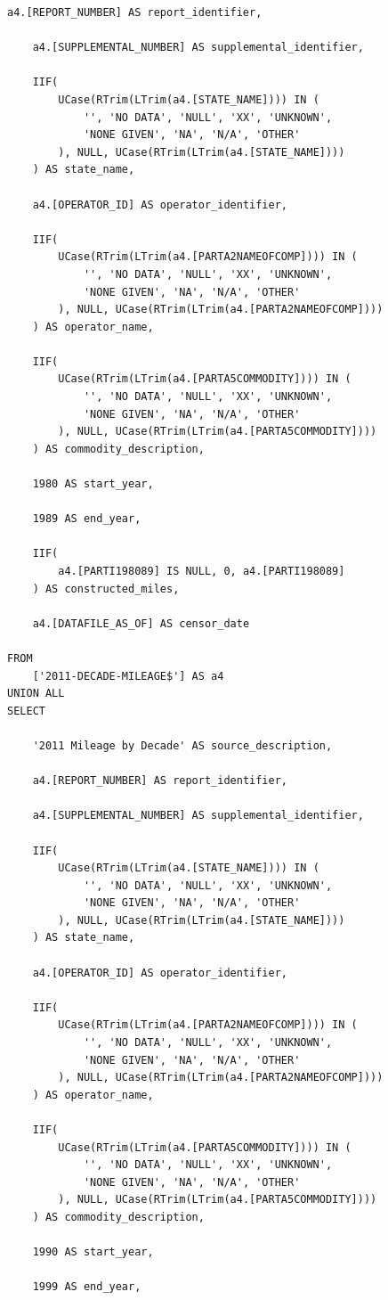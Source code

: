 \documentclass[letterpaper,10pt,oneside,final,onecolumn]{article}
\begin{document}
\begin{lstlisting}[label=mileage-query,caption={\textit{JetSQL} statement to pivot pipeline mileage}]
	a4.[REPORT_NUMBER] AS report_identifier,

	a4.[SUPPLEMENTAL_NUMBER] AS supplemental_identifier,

	IIF(
		UCase(RTrim(LTrim(a4.[STATE_NAME]))) IN (
			'', 'NO DATA', 'NULL', 'XX', 'UNKNOWN',
			'NONE GIVEN', 'NA', 'N/A', 'OTHER'
		), NULL, UCase(RTrim(LTrim(a4.[STATE_NAME])))
	) AS state_name,

	a4.[OPERATOR_ID] AS operator_identifier,

	IIF(
		UCase(RTrim(LTrim(a4.[PARTA2NAMEOFCOMP]))) IN (
			'', 'NO DATA', 'NULL', 'XX', 'UNKNOWN',
			'NONE GIVEN', 'NA', 'N/A', 'OTHER'
		), NULL, UCase(RTrim(LTrim(a4.[PARTA2NAMEOFCOMP])))
	) AS operator_name,

	IIF(
		UCase(RTrim(LTrim(a4.[PARTA5COMMODITY]))) IN (
			'', 'NO DATA', 'NULL', 'XX', 'UNKNOWN',
			'NONE GIVEN', 'NA', 'N/A', 'OTHER'
		), NULL, UCase(RTrim(LTrim(a4.[PARTA5COMMODITY])))
	) AS commodity_description,

	1980 AS start_year,

	1989 AS end_year,

	IIF(
		a4.[PARTI198089] IS NULL, 0, a4.[PARTI198089]
	) AS constructed_miles,

	a4.[DATAFILE_AS_OF] AS censor_date

FROM
	['2011-DECADE-MILEAGE$'] AS a4
UNION ALL
SELECT

	'2011 Mileage by Decade' AS source_description,

	a4.[REPORT_NUMBER] AS report_identifier,

	a4.[SUPPLEMENTAL_NUMBER] AS supplemental_identifier,

	IIF(
		UCase(RTrim(LTrim(a4.[STATE_NAME]))) IN (
			'', 'NO DATA', 'NULL', 'XX', 'UNKNOWN',
			'NONE GIVEN', 'NA', 'N/A', 'OTHER'
		), NULL, UCase(RTrim(LTrim(a4.[STATE_NAME])))
	) AS state_name,

	a4.[OPERATOR_ID] AS operator_identifier,

	IIF(
		UCase(RTrim(LTrim(a4.[PARTA2NAMEOFCOMP]))) IN (
			'', 'NO DATA', 'NULL', 'XX', 'UNKNOWN',
			'NONE GIVEN', 'NA', 'N/A', 'OTHER'
		), NULL, UCase(RTrim(LTrim(a4.[PARTA2NAMEOFCOMP])))
	) AS operator_name,

	IIF(
		UCase(RTrim(LTrim(a4.[PARTA5COMMODITY]))) IN (
			'', 'NO DATA', 'NULL', 'XX', 'UNKNOWN',
			'NONE GIVEN', 'NA', 'N/A', 'OTHER'
		), NULL, UCase(RTrim(LTrim(a4.[PARTA5COMMODITY])))
	) AS commodity_description,

	1990 AS start_year,

	1999 AS end_year,


\end{lstlisting}
\end{document}

